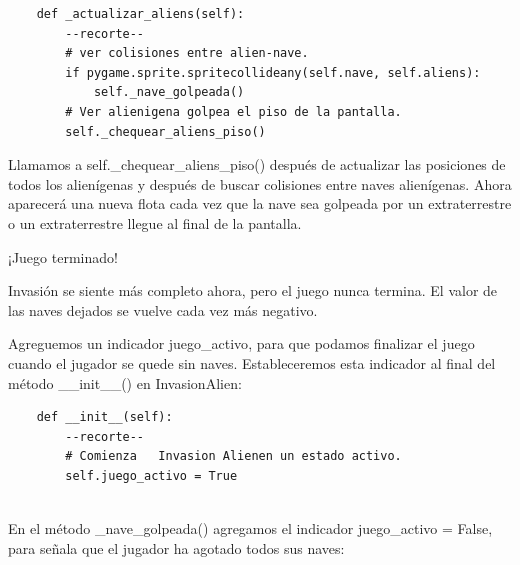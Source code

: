 \hspace{-2.4cm}{\ttfamily \scriptsize invasión}

\vspace{-0.2cm}
\hspace{-2.1cm}{\ttfamily \scriptsize \_alien.py}\vspace{-0.84cm}
\begin{lstlisting}
    def _actualizar_aliens(self):
        --recorte--
        # ver colisiones entre alien-nave.
        if pygame.sprite.spritecollideany(self.nave, self.aliens):
            self._nave_golpeada()
        # Ver alienigena golpea el piso de la pantalla.
        self._chequear_aliens_piso()
\end{lstlisting}


Llamamos a {\ttfamily self.\_chequear\_aliens\_piso()} después de actualizar las posiciones de todos los alienígenas y después de buscar colisiones entre naves alienígenas. Ahora aparecerá una nueva flota cada vez que la nave sea golpeada por un extraterrestre o un extraterrestre llegue al final de la pantalla.

¡Juego terminado!


Invasión se siente más completo ahora, pero el juego nunca termina. 
El valor de las naves dejados se vuelve cada vez más negativo.
 
Agreguemos un indicador {\ttfamily juego\_activo}, para que podamos finalizar el juego cuando el jugador se quede sin  naves. 
Estableceremos esta indicador al final del método \_\_init\_\_() en InvasionAlien:

\hspace{-2.4cm}{\ttfamily \scriptsize invasión}

\vspace{-0.2cm}
\hspace{-2.1cm}{\ttfamily \scriptsize \_alien.py}\vspace{-0.84cm}
\begin{lstlisting}
    def __init__(self):
        --recorte--
        # Comienza   Invasion Alienen un estado activo.
        self.juego_activo = True


\end{lstlisting}

En el método  {\ttfamily \_nave\_golpeada()} agregamos el indicador {\ttfamily juego\_activo  =  False}, para señala que el jugador
ha agotado todos sus naves:



\hspace{-2.4cm}{\ttfamily \scriptsize invasión}

